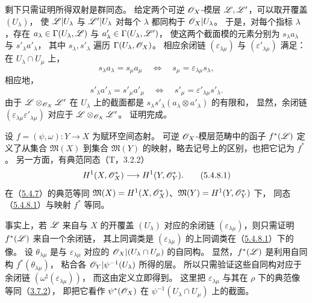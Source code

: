 剩下只需证明所得双射是群同态。
给定两个可逆 $\mathscr O_X$-模层 $\mathscr L,\mathscr L'$，可以取开覆盖 $(U_\lambda)$，
使 $\mathscr L|U_\lambda$ 与 $\mathscr L'|U_\lambda$ 对每个 $\lambda$ 都同构于 $\mathscr O_X|U_\lambda$。
于是，对每个指标 $\lambda$，存在
$a_\lambda\in\Gamma(U_\lambda,\mathscr L)$ 与 $a'_\lambda\in\Gamma(U_\lambda,\mathscr L')$，
使这两个截面模的元素分别为 $s_\lambda a_\lambda$ 与 $s'_\lambda a'_\lambda$，
其中 $s_\lambda,s'_\lambda$ 遍历 $\Gamma(U_\lambda,\mathscr O_X)$。
相应余闭链 $(\varepsilon_{\lambda\mu})$ 与 $(\varepsilon'_{\lambda\mu})$ 满足：在 $U_\lambda\cap U_\mu$ 上，
\[
 s_\lambda a_\lambda=s_\mu a_\mu
 \quad\Longleftrightarrow\quad
 s_\mu=\varepsilon_{\lambda\mu}s_\lambda,
\]
相应地，
\[
 s'_\lambda a'_\lambda=s'_\mu a'_\mu
 \quad\Longleftrightarrow\quad
 s'_\mu=\varepsilon'_{\lambda\mu}s'_\lambda.
\]
由于 $\mathscr L\otimes_{\mathscr O_X}\mathscr L'$ 在 $U_\lambda$ 上的截面都是
$s_\lambda s'_\lambda(a_\lambda\otimes a'_\lambda)$ 的有限和，
显然，余闭链 $(\varepsilon_{\lambda\mu}\varepsilon'_{\lambda\mu})$
对应于 $\mathscr L\otimes_{\mathscr O_X}\mathscr L'$。
证明完成。

设 $f=(\psi,\omega)\colon Y\to X$ 为赋环空间态射。
可逆 $\mathscr O_X$-模层范畴中的函子 $f^*(\mathscr L)$ 定义了从集合 $\mathfrak M(X)$
到集合 $\mathfrak M(Y)$ 的映射，略去记号上的区别，也把它记为 $f^*$。
另一方面，有典范同态（T，3.2.2）
\begin{equation}
 H^1(X,\mathscr O_X^*)\longrightarrow H^1(Y,\mathscr O_Y^*).
 \tag{5.4.8.1}\label{eq:0:5.4.8.1}
\end{equation}
在（\hyperlink{para:0:5.4.7}{5.4.7}）的典范等同
$\mathfrak M(X)=H^1(X,\mathscr O_X^*)$、$\mathfrak M(Y)=H^1(Y,\mathscr O_Y^*)$ 下，
同态（\hyperref[eq:0:5.4.8.1]{5.4.8.1}）与映射 $f^*$ 等同。

事实上，若 $\mathscr L$ 来自与 $X$ 的开覆盖 $(U_\lambda)$ 对应的余闭链
$(\varepsilon_{\lambda\mu})$，则只需证明 $f^*(\mathscr L)$ 来自一个余闭链，
其上同调类是 $(\varepsilon_{\lambda\mu})$ 的上同调类在（\hyperref[eq:0:5.4.8.1]{5.4.8.1}）下的像。
设 $\theta_{\lambda\mu}$ 是与 $\varepsilon_{\lambda\mu}$ 对应的
$\mathscr O_X|(U_\lambda\cap U_\mu)$ 的自同构。
显然，$f^*(\mathscr L)$ 是利用自同构 $f^*(\theta_{\lambda\mu})$，
粘合各 $\mathscr O_Y|\psi^{-1}(U_\lambda)$ 所得的层。
所以只需验证这些自同构对应于余闭链 $(\omega^\sharp(\varepsilon_{\lambda\mu}))$，
而这由定义立即得到。
这里把 $\varepsilon_{\lambda\mu}$ 与其在 $\rho$ 下的典范像等同（\hyperlink{para:0:3.7.2}{3.7.2}），
即把它看作 $\psi^*(\mathscr O_X)$ 在 $\psi^{-1}(U_\lambda\cap U_\mu)$ 上的截面。

